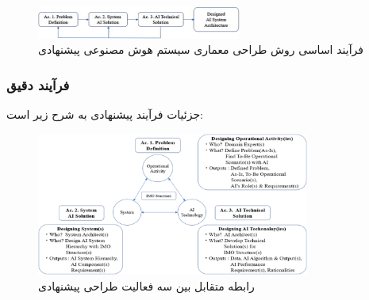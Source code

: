 \documentclass[a4paper,10pt]{article}
\begin{document}
                \begin{figure}[htbp]

                    \centering
                    \includegraphics[width=0.6\textwidth]{image/fig 4.png}
                    \caption{فرآیند اساسی روش طراحی معماری سیستم هوش مصنوعی پیشنهادی}
                    \label{fig:fig_4}
                
                \end{figure}

            \subsubsection{فرآیند دقیق}

                جزئیات فرآیند پیشنهادی به شرح زیر است:

                \begin{figure}[htbp]

                    \centering
                    \includegraphics[width=0.8\textwidth]{image/fig 5.png}
                    \caption{رابطه متقابل بین سه فعالیت طراحی پیشنهادی}
                    \label{fig:fig_5}
                
                \end{figure}
\end{document}
